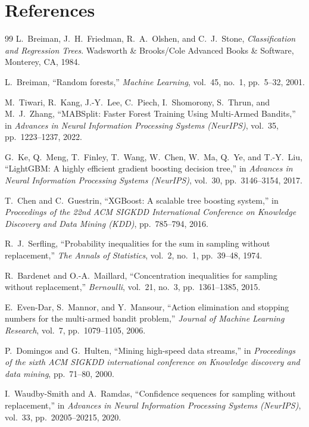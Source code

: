 \documentclass{article}
\begin{document}
	\pagebreak
	
	\section{References}
	\begin{thebibliography}{99}
		L.~Breiman, J.~H.~Friedman, R.~A.~Olshen, and C.~J.~Stone,
		\textit{Classification and Regression Trees}.
		Wadsworth \& Brooks/Cole Advanced Books \& Software, Monterey, CA, 1984.

		L.~Breiman,
		``Random forests,''
		\textit{Machine Learning}, vol.~45, no.~1, pp.~5--32, 2001.

		M.~Tiwari, R.~Kang, J.-Y.~Lee, C.~Piech, I.~Shomorony, S.~Thrun, and M.~J.~Zhang,
		``MABSplit: Faster Forest Training Using Multi-Armed Bandits,''
		in \textit{Advances in Neural Information Processing Systems (NeurIPS)}, vol.~35, pp.~1223--1237, 2022.

		G.~Ke, Q.~Meng, T.~Finley, T.~Wang, W.~Chen, W.~Ma, Q.~Ye, and T.-Y.~Liu,
		``LightGBM: A highly efficient gradient boosting decision tree,''
		in \textit{Advances in Neural Information Processing Systems (NeurIPS)}, vol.~30, pp.~3146--3154, 2017.

		T.~Chen and C.~Guestrin,
		``XGBoost: A scalable tree boosting system,''
		in \textit{Proceedings of the 22nd ACM SIGKDD International Conference on Knowledge Discovery and Data Mining (KDD)}, pp.~785--794, 2016.

		R.~J.~Serfling,
		``Probability inequalities for the sum in sampling without replacement,''
		\textit{The Annals of Statistics}, vol.~2, no.~1, pp.~39--48, 1974.

		R.~Bardenet and O.-A.~Maillard,
		``Concentration inequalities for sampling without replacement,''
		\textit{Bernoulli}, vol.~21, no.~3, pp.~1361--1385, 2015.

		E.~Even-Dar, S.~Mannor, and Y.~Mansour,
		``Action elimination and stopping numbers for the multi-armed bandit problem,''
		\textit{Journal of Machine Learning Research}, vol.~7, pp.~1079--1105, 2006.

		P.~Domingos and G.~Hulten,
		``Mining high-speed data streams,''
		in \textit{Proceedings of the sixth ACM SIGKDD international conference on Knowledge discovery and data mining}, pp.~71--80, 2000.

		I.~Waudby-Smith and A.~Ramdas,
		``Confidence sequences for sampling without replacement,''
		in \textit{Advances in Neural Information Processing Systems (NeurIPS)}, vol.~33, pp.~20205--20215, 2020.
	\end{thebibliography}
\end{document}

